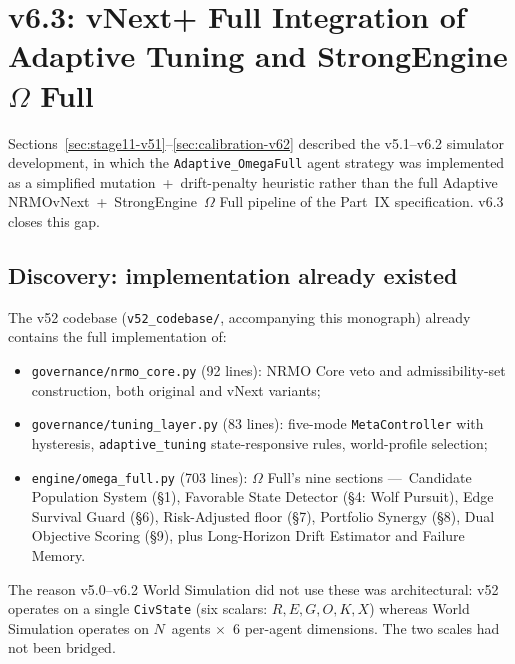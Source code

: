 \section{v6.3: vNext+ Full Integration of Adaptive Tuning and StrongEngine $\Omega$ Full}
\label{sec:vnext-plus-v63}


Sections~\ref{sec:stage11-v51}--\ref{sec:calibration-v62} described the
v5.1--v6.2 simulator development, in which the \texttt{Adaptive\_OmegaFull}
agent strategy was implemented as a simplified mutation~+~drift-penalty
heuristic rather than the full Adaptive NRMOvNext~+~StrongEngine~$\Omega$
Full pipeline of the Part~IX specification. v6.3 closes this gap.

\subsection{Discovery: implementation already existed}

The v52 codebase (\texttt{v52\_codebase/}, accompanying this monograph)
already contains the full implementation of:
\begin{itemize}
\item \texttt{governance/nrmo\_core.py} (92 lines): NRMO Core veto and
  admissibility-set construction, both original and vNext variants;
\item \texttt{governance/tuning\_layer.py} (83 lines): five-mode
  \texttt{MetaController} with hysteresis, \texttt{adaptive\_tuning}
  state-responsive rules, world-profile selection;
\item \texttt{engine/omega\_full.py} (703 lines): $\Omega$ Full's nine
  sections —~Candidate Population System (\S1), Favorable State Detector
  (\S4: Wolf Pursuit), Edge Survival Guard (\S6), Risk-Adjusted floor
  (\S7), Portfolio Synergy (\S8), Dual Objective Scoring (\S9), plus
  Long-Horizon Drift Estimator and Failure Memory.
\end{itemize}

The reason v5.0--v6.2 World Simulation did not use these was
architectural: v52 operates on a single \texttt{CivState} (six scalars:
$R,E,G,O,K,X$) whereas World Simulation operates on $N$~agents $\times$~6
per-agent dimensions. The two scales had not been bridged.

